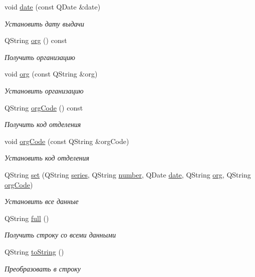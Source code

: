 \begin{DoxyCompactItemize}
void \hyperlink{classkpk_1_1data_1_1_passport_a03dc05509b3b5b9d0e62cc26702c45eb}{date} (const Q\+Date \&date)
\begin{DoxyCompactList}\small\item\em Установить дату выдачи \end{DoxyCompactList}\item 
Q\+String \hyperlink{classkpk_1_1data_1_1_passport_ad15c144b9acbdcafbee4111f8f763c07}{org} () const 
\begin{DoxyCompactList}\small\item\em Получить организацию \end{DoxyCompactList}\item 
void \hyperlink{classkpk_1_1data_1_1_passport_a2a48baa96953345dda7329efc8218ec5}{org} (const Q\+String \&org)
\begin{DoxyCompactList}\small\item\em Установить организацию \end{DoxyCompactList}\item 
Q\+String \hyperlink{classkpk_1_1data_1_1_passport_a9cf26ca78882684924c50cefc2b0ff6a}{org\+Code} () const 
\begin{DoxyCompactList}\small\item\em Получить код отделения \end{DoxyCompactList}\item 
void \hyperlink{classkpk_1_1data_1_1_passport_ac5762a45b6d3a1c2450402ada2b46138}{org\+Code} (const Q\+String \&org\+Code)
\begin{DoxyCompactList}\small\item\em Установить код отделения \end{DoxyCompactList}\item 
Q\+String \hyperlink{classkpk_1_1data_1_1_passport_a1c52607e828b39be3db6269ab97482bb}{set} (Q\+String \hyperlink{classkpk_1_1data_1_1_passport_aa39a5d6fe1bdd5f736b1fca37dda1850}{series}, Q\+String \hyperlink{classkpk_1_1data_1_1_passport_a2e2fa488ffaa7934db189d78c3a73319}{number}, Q\+Date \hyperlink{classkpk_1_1data_1_1_passport_afe8d9f68888e8e820347d31f60485a24}{date}, Q\+String \hyperlink{classkpk_1_1data_1_1_passport_ad15c144b9acbdcafbee4111f8f763c07}{org}, Q\+String \hyperlink{classkpk_1_1data_1_1_passport_a9cf26ca78882684924c50cefc2b0ff6a}{org\+Code})
\begin{DoxyCompactList}\small\item\em Установить все данные \end{DoxyCompactList}\item 
Q\+String \hyperlink{classkpk_1_1data_1_1_passport_a0567698401005bda3405ee898d00e9de}{full} ()
\begin{DoxyCompactList}\small\item\em Получить строку со всеми данными \end{DoxyCompactList}\item 
Q\+String \hyperlink{classkpk_1_1data_1_1_passport_a753a337f21927ccfbfd26edce757de7b}{to\+String} ()
\begin{DoxyCompactList}\small\item\em Преобразовать в строку \end{DoxyCompactList}\end{DoxyCompactItemize}
